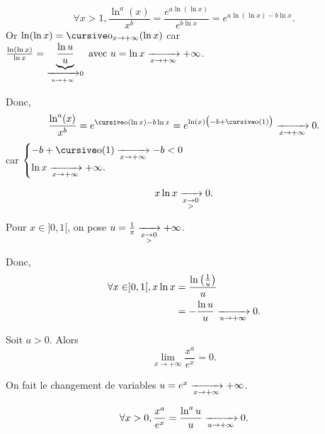 \begin{prv}
	\[
		\forall x > 1, \frac{\ln^a(x)}{x^b} = \frac{e^{a\ln(\ln x)}}{e^{b\ln x}} = e^{a\ln(\ln x) - b \ln x}.
	\] Or $\ln(\ln x) = \po_{x\to +\infty}(\ln x)$ car $\frac{\ln(\ln x)}{\ln x} = \underbrace{\frac{\ln u}{u}}_{\xrightarrow[u\to +\infty]{} 0} \text{ avec } u = \ln x \xrightarrow[x\to +\infty]{} +\infty$.

	Donc, \[
		\frac{\ln^a(x)}{x^b} = e^{\po(\ln x) - b\ln x} = e^{\ln(x)\big(-b + \po(1)\big)} \tendsto{x \to +\infty} 0.
	\] car $\begin{cases}
		-b + \po(1) \tendsto{x\to +\infty} -b < 0\\
		\ln x \tendsto{x\to +\infty} +\infty.
	\end{cases}$
\end{prv}

\begin{crlr}
	\[
		x \ln x \xrightarrow[\substack{x\to 0\\>}]{} 0.
	\]
\end{crlr}

\begin{prv}
	Pour $x \in ]0,1[$, on pose $u = \frac{1}{x}\xrightarrow[\substack{x\to 0\\>}]{} +\infty$.

	Donc,
	\begin{align*}
		\forall x \in ]0,1[, x \ln x &= \frac{\ln\left( \frac{1}{u} \right)}{u} \\
		&= - \frac{\ln u}{u} \xrightarrow[u\to +\infty]{} 0.\\
	\end{align*}
\end{prv}

\begin{crlr}
	Soit $a > 0$. Alors \[
		\lim_{x\to +\infty} \frac{x^a}{e^x} = 0.
	\]
\end{crlr}

\begin{prv}
	On fait le changement de variables $u = e^x \xrightarrow[x\to +\infty]{} +\infty$.

	\[
		\forall x > 0, \frac{x^a}{e^x} = \frac{\ln^a u}{u} \xrightarrow[u\to +\infty]{} 0.
	\]
\end{prv}
